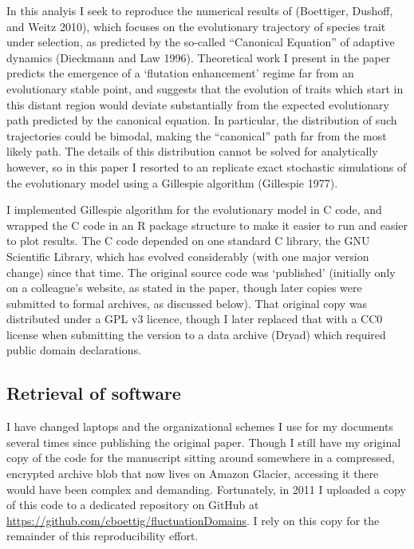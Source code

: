 \documentclass[
]{rescience}
\begin{document}
In this analyis I seek to reproduce the numerical results of (Boettiger,
Dushoff, and Weitz 2010), which focuses on the evolutionary trajectory
of species trait under selection, as predicted by the so-called
``Canonical Equation'' of adaptive dynamics (Dieckmann and Law 1996).
Theoretical work I present in the paper predicts the emergence of a
`flutation enhancement' regime far from an evolutionary stable point,
and suggests that the evolution of traits which start in this distant
region would deviate substantially from the expected evolutionary path
predicted by the canonical equation. In particular, the distribution of
such trajectories could be bimodal, making the ``canonical'' path far
from the most likely path. The details of this distribution cannot be
solved for analytically however, so in this paper I resorted to an
replicate exact stochastic simulations of the evolutionary model using a
Gillespie algorithm (Gillespie 1977).

I implemented Gillespie algorithm for the evolutionary model in C code,
and wrapped the C code in an R package structure to make it easier to
run and easier to plot results. The C code depended on one standard C
library, the GNU Scientific Library, which has evolved considerably
(with one major version change) since that time. The original source
code was `published' (initially only on a colleague's website, as stated
in the paper, though later copies were submitted to formal archives, as
discussed below). That original copy was distributed under a GPL v3
licence, though I later replaced that with a CC0 license when submitting
the version to a data archive (Dryad) which required public domain
declarations.

\hypertarget{retrieval-of-software}{%
\subsection{Retrieval of software}\label{retrieval-of-software}}

I have changed laptops and the organizational schemes I use for my
documents several times since publishing the original paper. Though I
still have my original copy of the code for the manuscript sitting
around somewhere in a compressed, encrypted archive blob that now lives
on Amazon Glacier, accessing it there would have been complex and
demanding. Fortunately, in 2011 I uploaded a copy of this code to a
dedicated repository on GitHub at
\url{https://github.com/cboettig/fluctuationDomains}. I rely on this
copy for the remainder of this reproducibility effort.
\end{document}
